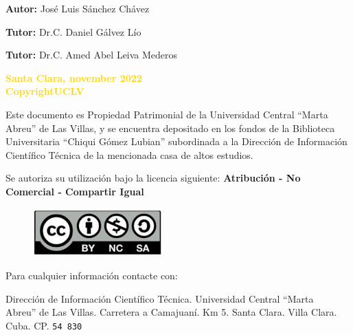 \documentclass[12pt]{article}
\begin{document}
\vspace*{1cm}

\begin{center}
    \large{\textbf{Autor:} Jos\'e Luis S\'anchez Ch\'avez }
\end{center}

\begin{center}
    \large{\textbf{Tutor:} Dr.C. Daniel Gálvez L\'io}
\end{center}

\begin{center}
    \large{\textbf{Tutor:} Dr.C. Amed Abel Leiva Mederos}
\end{center}

\vspace*{0.3cm}

\begin{center}
    \textbf{\textcolor{gold}{Santa Clara, november 2022 \\ Copyright\textcopyright UCLV}}
\end{center}


\clearpage


\newpage

\setcounter{page}{3}

\vspace*{10cm}
\noindent Este documento es Propiedad Patrimonial de la Universidad Central “Marta Abreu” de Las Villas, y se encuentra depositado en los fondos de la Bi\-blio\-te\-ca Universitaria “Chiqui Gómez Lubian” subordinada a la Dirección de In\-for\-ma\-ción Científico Técnica de la mencionada casa de altos estudios.

Se autoriza su utilización bajo la licencia siguiente: \newline
\textbf{Atribución - No Comercial - Compartir Igual}

\begin{figure}[H]
    \includegraphics[width=5cm]{imag/license.png}
\end{figure}

Para cualquier información contacte con:

\noindent  Dirección de Información Científico Técnica. Universidad Central “Marta\\ Abreu” de Las Villas. Carretera a Camajuaní. Km 5. Santa Clara. Villa Clara. Cuba. CP. \texttt{54 830}
\end{document}
